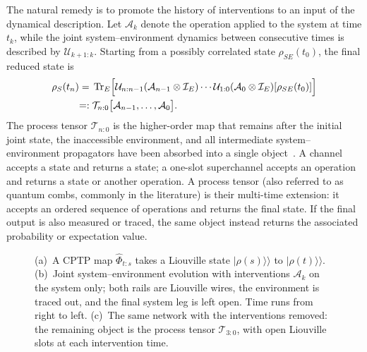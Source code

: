 The natural remedy is to promote the history of interventions to an input of the dynamical description.
Let \(\mathcal A_k\) denote the operation applied to the system at time \(t_k\), while the joint system--environment dynamics between consecutive times is described by \(\mathcal U_{k+1:k}\).
Starting from a possibly correlated state \(\rho_{SE}(t_0)\), the final reduced state is
%
\begin{align}
    \rho_S(t_n)
    ={}& \operatorname{Tr}_E \Bigl[ \mathcal U_{n:n-1} (\mathcal A_{n-1}\otimes\mathcal I_E) \cdots \mathcal U_{1:0} (\mathcal A_0\otimes\mathcal I_E) [\rho_{SE}(t_0)] \Bigr] \nonumber\\
    =:{}& \mathcal T_{n:0} \bigl[ \mathcal A_{n-1},\ldots,\mathcal A_0 \bigr].
    \label{eq:process-tensor-operational-definition}
\end{align}
%
The process tensor \(\mathcal T_{n:0}\) is the higher-order map that remains after the initial joint state, the inaccessible environment, and all intermediate system--environment propagators have been absorbed into a single object~\cite{Pollock2018Framework,Milz2021,Taranto2025}.
A channel accepts a state and returns a state; a one-slot superchannel accepts an operation and returns a state or another operation.
A process tensor (also referred to as quantum combs, commonly in the literature) is their multi-time extension: it accepts an ordered sequence of operations and returns the final state.
If the final output is also measured or traced, the same object instead returns the associated probability or expectation value.
%
\begin{figure}[t]
    \centering
    
    \caption{ (a)~A CPTP map \(\hat{\Phi}_{t:s}\) takes a Liouville state \(\lvert\rho(s)\rangle\!\rangle\) to \(\lvert\rho(t)\rangle\!\rangle\).
        (b)~Joint system--environment evolution with interventions \(\mathcal A_k\) on the system only; both rails are Liouville wires, the environment is traced out, and the final system leg is left open.
        Time runs from right to left.
        (c)~The same network with the interventions removed: the remaining object is the process tensor \(\mathcal T_{3:0}\), with open
        Liouville slots at each intervention time.
    }
    \label{fig:channel-to-multitime-process}
\end{figure}
%

